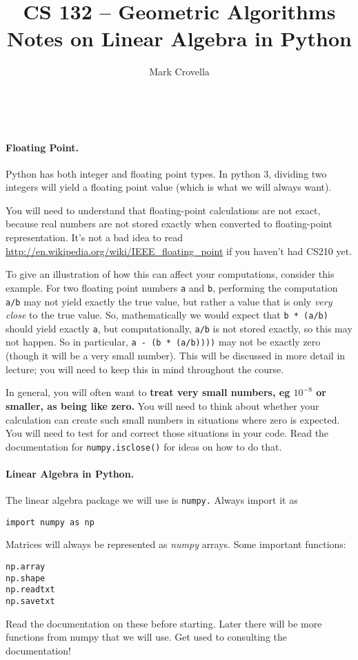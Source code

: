 \documentclass{article}
\begin{document}
\thispagestyle{empty}

\title{CS 132 -- Geometric Algorithms\\[0.25\baselineskip]Notes on Linear Algebra in Python}
\author{Mark Crovella}
\date{~}
\maketitle

\paragraph{Floating Point.}  Python has both integer and floating point types.  In python 3, dividing two integers will yield a floating point value (which is what we will always want).

You will need to understand that floating-point calculations are not
exact, because real numbers are not stored exactly when converted to
floating-point representation.   It's not a bad idea to read
\url{http://en.wikipedia.org/wiki/IEEE_floating_point} if you haven't
had CS210 yet.    

To give an illustration of how this can affect your computations,
consider this example.   For two floating point numbers \texttt{a} and
\texttt{b}, performing the computation \texttt{a/b} may not yield
exactly the true value, but rather a value that is only \emph{very
  close} to the true value.    So, mathematically we would expect that
\texttt{b * (a/b)} should yield exactly \texttt{a}, but computationally,
\texttt{a/b} is not stored exactly, so this may not happen.   So in
particular, \texttt{a - (b * (a/b))))} may not be exactly zero (though
it will be a very small number).   This will be discussed in more detail in lecture; you
will need to keep this in mind throughout the course. 

In general, you will often want to \textbf{treat very small numbers, eg
  $10^{-8}$ or smaller, as being like zero.}   You will need to think about whether
your calculation can create such small numbers in situations where zero
is expected.   You will need to test for and correct those situations in
your code.   Read the documentation for \texttt{numpy.isclose()} for
ideas on how to do that.

\paragraph{Linear Algebra in Python.} The linear algebra package we will use is \texttt{numpy.}  Always import it as
\begin{verbatim}
import numpy as np
\end{verbatim}
Matrices will always be represented as \emph{numpy} arrays.   Some important functions:
\begin{verbatim}
np.array
np.shape
np.readtxt
np.savetxt
\end{verbatim}
Read the documentation on these before starting.  Later there will be more functions from numpy that we will use.  Get used to consulting the documentation!
\end{document}
